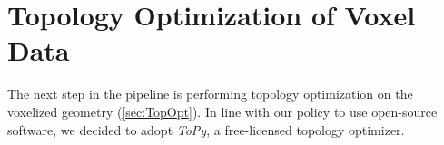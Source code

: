 \section{Topology Optimization of Voxel Data}
\label{sec:ToPy}
The next step in the pipeline is performing topology optimization on the voxelized geometry (\ref{sec:TopOpt}). 
In line with our policy to use open-source software, we decided to adopt \emph{ToPy}, a free-licensed topology optimizer.








